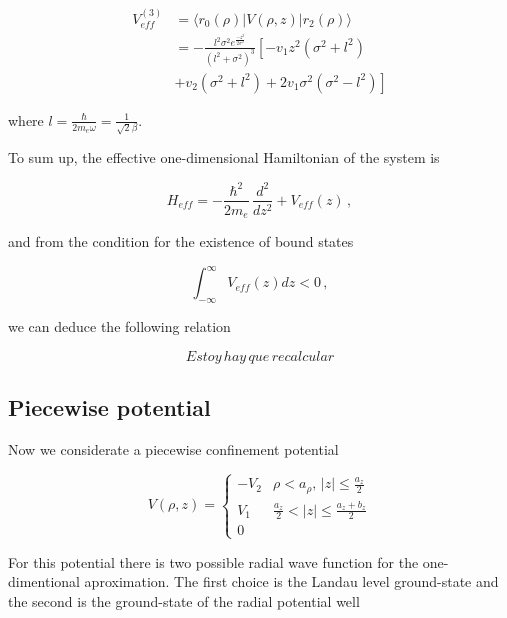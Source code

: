 \documentclass[a4paper,10pt]{article}
\begin{document}
\begin{equation}
  \begin{split}
    V_{eff}^{(3)} &= \langle r_0(\rho) \lvert V(\rho,z) \lvert r_2(\rho) \rangle \\
    &= -\frac{l^2\sigma^2 e^{\frac{-z^2}{2\sigma^2}}}{(l^2+\sigma^2)^3} \left[-v_1 z^2\left(\sigma^2 + l^2\right) \right.\\
    &\left.+ v_2 \left(\sigma^2 + l^2\right) + 2v_1\sigma^2 \left(\sigma^2 - l^2 \right) \right]
  \end{split}
\end{equation}

\noindent where $l = \frac{\hbar}{2 m_e \omega} = \frac{1}{\sqrt{2}\beta}$.

To sum up, the effective one-dimensional Hamiltonian of the system is

\begin{equation}
  H_{eff} = -\frac{\hbar^2}{2 m_e}\,\frac{d^2}{dz^2} + V_{eff}(z)\,,
\end{equation}

\noindent and from the condition for the existence of bound states

\begin{equation}
  \int_{-\infty}^{\infty} V_{eff}(z) dz < 0\,,
\end{equation}

\noindent we can deduce the following relation

\begin{equation}
  Estoy\, hay\, que\, recalcular
\end{equation}

\subsection*{Piecewise potential}
Now we considerate a piecewise confinement potential

\begin{equation}
  V(\rho, z) = \left\{ \begin{matrix}
                         -V_2 & \rho<a_{\rho},\, |z|\leq\frac{a_z}{2} \\
                         V_1  & \frac{a_z}{2}< |z| \leq \frac{a_z + b_z}{2}\\
                         0
                       \end{matrix}\right.
\end{equation}

For this potential there is two possible radial wave function for the one-dimentional aproximation. The
first choice is the Landau level ground-state and the second is the ground-state of the radial potential well
\end{document}
